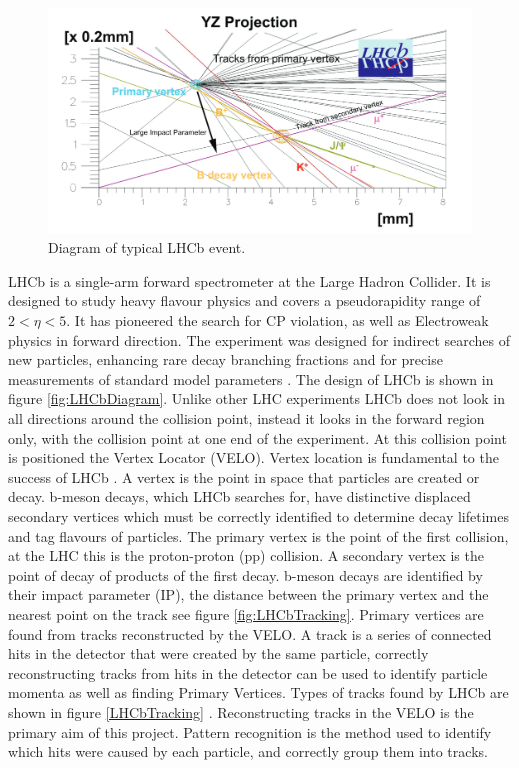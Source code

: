 \begin{figure}[h] %
\centering
\includegraphics[width=\textwidth]{EventDiagram.png}
\caption{Diagram of typical LHCb event.} 
\label{fig:EventDiagram} 
\end{figure}

LHCb is a single-arm forward spectrometer at the Large Hadron Collider. It is designed to study heavy flavour physics and covers a pseudorapidity range of $2 < \eta < 5$. It has pioneered the search for CP violation, as well as Electroweak physics in forward direction. The experiment was designed for indirect searches of new particles, enhancing rare decay branching fractions and for precise measurements of standard model parameters \citep{Collaboration2008TheLHC}. The design of LHCb is shown in figure \ref{fig:LHCbDiagram}. Unlike other LHC experiments LHCb does not look in all directions around the collision point, instead it looks in the forward region only, with the collision point at one end of the experiment. At this collision point is positioned the Vertex Locator (VELO). Vertex location is fundamental to the success of LHCb \citep{Barbosa-Marinho:504321}. A vertex is the point in space that particles are created or decay. b-meson decays, which LHCb searches for, have distinctive displaced secondary vertices which must be correctly identified to determine decay lifetimes and tag flavours of particles. The primary vertex is the point of the first collision, at the LHC this is the proton-proton (pp) collision. A secondary vertex is the point of decay of products of the first decay. b-meson decays are identified by their impact parameter (IP), the distance between the primary vertex and the nearest point on the track \cite{Kucharczyk:1756296} see figure \ref{fig:LHCbTracking}. Primary vertices are found from tracks reconstructed by the VELO. A track is a series of connected hits in the detector that were created by the same particle, correctly reconstructing tracks from hits in the detector can be used to identify particle momenta as well as finding Primary Vertices. Types of tracks found by LHCb are shown in figure \ref{LHCbTracking} \cite{LHCb2012TrackingLHCb}. Reconstructing tracks in the VELO is the primary aim of this project. Pattern recognition is the method used to identify which hits were caused by each particle, and correctly group them into tracks.

